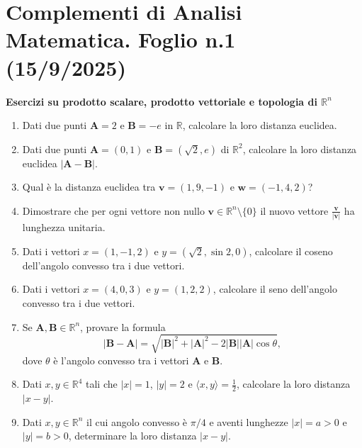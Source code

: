 \section*{Complementi di Analisi Matematica. Foglio n.1 (15/9/2025)}

\textbf{Esercizi su prodotto scalare, prodotto vettoriale e topologia di $\mathbb{R}^n$}

\begin{enumerate}
	\item Dati due punti $\mathbf{A} = 2$ e $\mathbf{B} = -e$ in $\mathbb{R}$, calcolare la loro distanza euclidea.
	
	\item Dati due punti $\mathbf{A} = (0,1)$ e $\mathbf{B} = (\sqrt{2},e)$ di $\mathbb{R}^2$, calcolare la loro distanza euclidea $|\mathbf{A} - \mathbf{B}|$.
	
	\item Qual è la distanza euclidea tra $\mathbf{v} = (1,9,-1)$ e $\mathbf{w} = (-1,4,2)$?
	
	\item Dimostrare che per ogni vettore non nullo $\mathbf{v} \in \mathbb{R}^n \setminus \{0\}$ il nuovo vettore $\frac{\mathbf{v}}{|\mathbf{v}|}$ ha lunghezza unitaria.
	
	\item Dati i vettori $x = (1, -1, 2)$ e $y = (\sqrt{2}, \sin 2, 0)$, calcolare il coseno dell'angolo convesso tra i due vettori.
	
	\item Dati i vettori $x = (4,0,3)$ e $y = (1,2,2)$, calcolare il seno dell'angolo convesso tra i due vettori.
	
	\item Se $\mathbf{A}, \mathbf{B} \in \mathbb{R}^n$, provare la formula
	\[
	| \mathbf{B} - \mathbf{A} | = \sqrt{|\mathbf{B}|^2 + |\mathbf{A}|^2 - 2 |\mathbf{B}| |\mathbf{A}| \cos \theta},
	\]
	dove $\theta$ è l'angolo convesso tra i vettori $\mathbf{A}$ e $\mathbf{B}$.
	
	\item Dati $x, y \in \mathbb{R}^4$ tali che $|x| = 1$, $|y| = 2$ e $\langle x, y \rangle = \frac{1}{2}$, calcolare la loro distanza $|x - y|$.
	
	\item Dati $x, y \in \mathbb{R}^n$ il cui angolo convesso è $\pi/4$ e aventi lunghezze $|x| = a > 0$ e $|y| = b > 0$, determinare la loro distanza $|x - y|$.
	

\end{enumerate}
